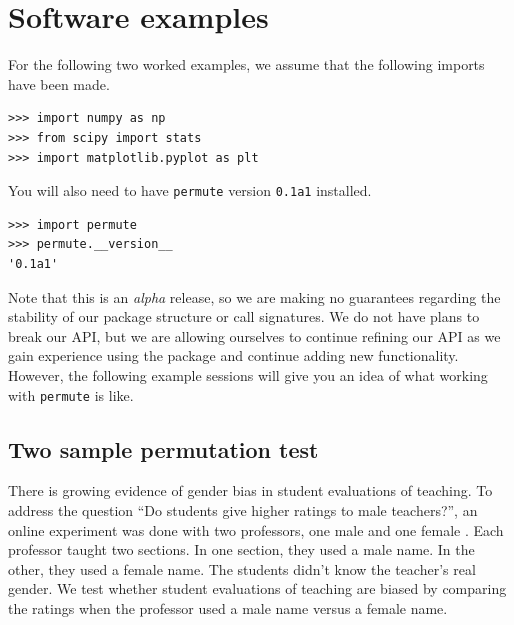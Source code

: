 \chapter{\label{app:ex}Software examples}

For the following two worked examples, we assume that the following imports 
have been made.

\begin{verbatim}
>>> import numpy as np
>>> from scipy import stats
>>> import matplotlib.pyplot as plt
\end{verbatim}

You will also need to have \texttt{permute} version \texttt{0.1a1} installed.

\begin{verbatim}
>>> import permute
>>> permute.__version__
'0.1a1'
\end{verbatim}

Note that this is an \emph{alpha} release, so we are making no guarantees
regarding the stability of our package structure or call signatures.  We do not
have plans to break our API, but we are allowing ourselves to continue refining
our API as we gain experience using the package and continue adding new
functionality.  However, the following example sessions will give you an idea
of what working with \texttt{permute} is like.

\section*{Two sample permutation test}

There is growing evidence of gender bias in student evaluations of teaching.
To address the question ``Do students give higher ratings to male teachers?'',
an online experiment was done with two professors, one male and one female
\cite{macnell2014s}.  Each professor taught two sections. In one section, they
used a male name.  In the other, they used a female name. The students didn't
know the teacher's real gender.  We test whether student evaluations of
teaching are biased by comparing the ratings when the professor used a male
name versus a female name.

